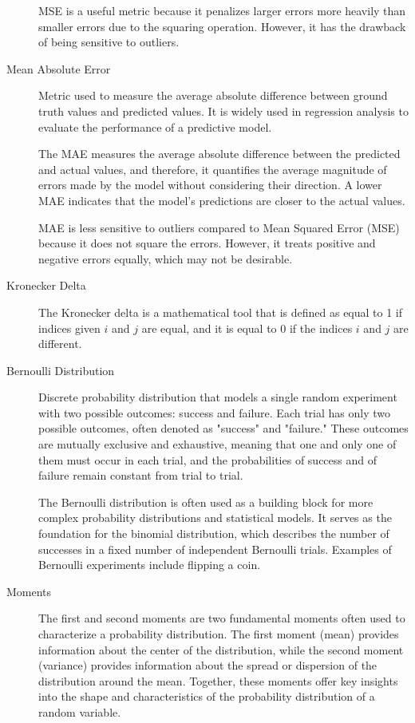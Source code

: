 \documentclass[a4paper]{article}
\begin{document}
\begin{description}
MSE is a useful metric because it penalizes larger errors more heavily than smaller errors due to the squaring operation. However, it has the drawback of being sensitive to outliers.

\item[Mean Absolute Error]
Metric used to measure the average absolute difference between ground truth values and predicted values. It is widely used in regression analysis to evaluate the performance of a predictive model.

The MAE measures the average absolute difference between the predicted and actual values, and therefore, it quantifies the average magnitude of errors made by the model without considering their direction. A lower MAE indicates that the model's predictions are closer to the actual values.

MAE is less sensitive to outliers compared to Mean Squared Error (MSE) because it does not square the errors. However, it treats positive and negative errors equally, which may not be desirable.

\item[Kronecker Delta]
The Kronecker delta is a mathematical tool that is defined as equal to 1 if indices given $i$ and $j$ are equal, and it is equal to 0 if the indices $i$ and $j$ are different.

\item[Bernoulli Distribution]
Discrete probability distribution that models a single random experiment with two possible outcomes: success and failure. Each trial has only two possible outcomes, often denoted as "success" and "failure." These outcomes are mutually exclusive and exhaustive, meaning that one and only one of them must occur in each trial, and the probabilities of success and of failure remain constant from trial to trial. 

The Bernoulli distribution is often used as a building block for more complex probability distributions and statistical models. It serves as the foundation for the binomial distribution, which describes the number of successes in a fixed number of independent Bernoulli trials. Examples of Bernoulli experiments include flipping a coin.

\item[Moments]
The first and second moments are two fundamental moments often used to characterize a probability distribution. The first moment (mean) provides information about the center of the distribution, while the second moment (variance) provides information about the spread or dispersion of the distribution around the mean. Together, these moments offer key insights into the shape and characteristics of the probability distribution of a random variable.


\end{description}
\end{document}
